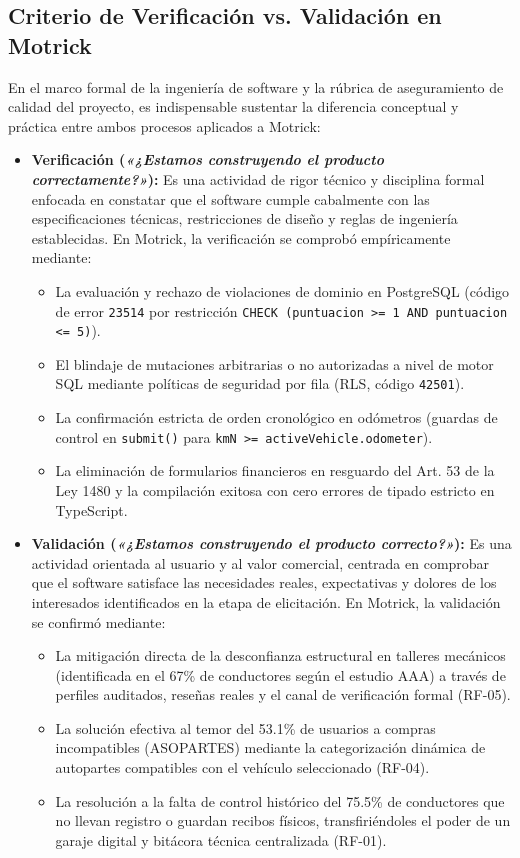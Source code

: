 \documentclass[11pt,letterpaper]{article}
\begin{document}
\subsection{Criterio de Verificación vs. Validación en Motrick}
En el marco formal de la ingeniería de software y la rúbrica de aseguramiento de calidad del proyecto, es indispensable sustentar la diferencia conceptual y práctica entre ambos procesos aplicados a Motrick:

\begin{itemize}
    \item \textbf{Verificación (\textit{«¿Estamos construyendo el producto correctamente?»}):} Es una actividad de rigor técnico y disciplina formal enfocada en constatar que el software cumple cabalmente con las especificaciones técnicas, restricciones de diseño y reglas de ingeniería establecidas. En Motrick, la verificación se comprobó empíricamente mediante:
    \begin{itemize}
        \item La evaluación y rechazo de violaciones de dominio en PostgreSQL (código de error \texttt{23514} por restricción \texttt{CHECK (puntuacion >= 1 AND puntuacion <= 5)}).
        \item El blindaje de mutaciones arbitrarias o no autorizadas a nivel de motor SQL mediante políticas de seguridad por fila (RLS, código \texttt{42501}).
        \item La confirmación estricta de orden cronológico en odómetros (guardas de control en \texttt{submit()} para \texttt{kmN >= activeVehicle.odometer}).
        \item La eliminación de formularios financieros en resguardo del Art. 53 de la Ley 1480 y la compilación exitosa con cero errores de tipado estricto en TypeScript.
    \end{itemize}
    \item \textbf{Validación (\textit{«¿Estamos construyendo el producto correcto?»}):} Es una actividad orientada al usuario y al valor comercial, centrada en comprobar que el software satisface las necesidades reales, expectativas y dolores de los interesados identificados en la etapa de elicitación. En Motrick, la validación se confirmó mediante:
    \begin{itemize}
        \item La mitigación directa de la desconfianza estructural en talleres mecánicos (identificada en el 67\% de conductores según el estudio AAA) a través de perfiles auditados, reseñas reales y el canal de verificación formal (RF-05).
        \item La solución efectiva al temor del 53.1\% de usuarios a compras incompatibles (ASOPARTES) mediante la categorización dinámica de autopartes compatibles con el vehículo seleccionado (RF-04).
        \item La resolución a la falta de control histórico del 75.5\% de conductores que no llevan registro o guardan recibos físicos, transfiriéndoles el poder de un garaje digital y bitácora técnica centralizada (RF-01).
    \end{itemize}
\end{itemize}
\end{document}
